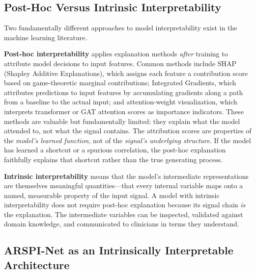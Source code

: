 \subsection{Post-Hoc Versus Intrinsic Interpretability}

Two fundamentally different approaches to model interpretability exist in the machine learning literature.

\textbf{Post-hoc interpretability} applies explanation methods \emph{after} training to attribute model decisions to input features. Common methods include SHAP (Shapley Additive Explanations), which assigns each feature a contribution score based on game-theoretic marginal contributions; Integrated Gradients, which attributes predictions to input features by accumulating gradients along a path from a baseline to the actual input; and attention-weight visualization, which interprets transformer or GAT attention scores as importance indicators. These methods are valuable but fundamentally limited: they explain what the model attended to, not what the signal contains. The attribution scores are properties of the \emph{model's learned function}, not of the \emph{signal's underlying structure}. If the model has learned a shortcut or a spurious correlation, the post-hoc explanation faithfully explains that shortcut rather than the true generating process.

\textbf{Intrinsic interpretability} means that the model's intermediate representations are themselves meaningful quantities---that every internal variable maps onto a named, measurable property of the input signal. A model with intrinsic interpretability does not require post-hoc explanation because its signal chain \emph{is} the explanation. The intermediate variables can be inspected, validated against domain knowledge, and communicated to clinicians in terms they understand.

\subsection{ARSPI-Net as an Intrinsically Interpretable Architecture}

